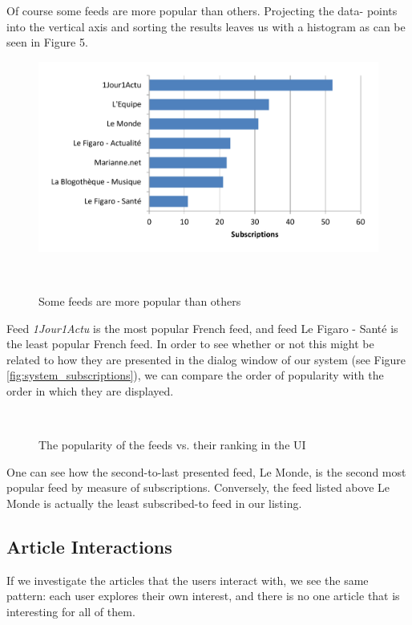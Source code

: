 Of course some feeds are more popular than others. Projecting the data- points into the vertical axis and sorting the results leaves us with a histogram as can be seen in Figure 5.

\begin{figure}[h!]
\centering
  \includegraphics[width=\columnwidth]{figures/feed_popularity}
  \caption{Some feeds are more popular than others}~\label{fig:registrations}
\end{figure}


Feed {\em 1Jour1Actu} is the most popular French feed, and feed Le Figaro - Sant\'e is the least popular French feed. In order to see whether or not this might be related to how they are presented in the dialog window of our system (see Figure \ref{fig:system_subscriptions}), we can compare the order of popularity with the order in which they are displayed.

\begin{figure}[h!]
\centering
  
  \caption{The popularity of the feeds vs. their ranking in the UI}~\label{fig:registrations}
\end{figure}

One can see how the second-to-last presented feed, Le Monde, is the second most popular feed by measure of subscriptions. Conversely, the feed listed above Le Monde is actually the least subscribed-to feed in our listing.

\subsection{Article Interactions}
If we investigate the articles that the users interact with, we see the same pattern: each user explores their own interest, and there is no one article that is interesting for all of them. 

